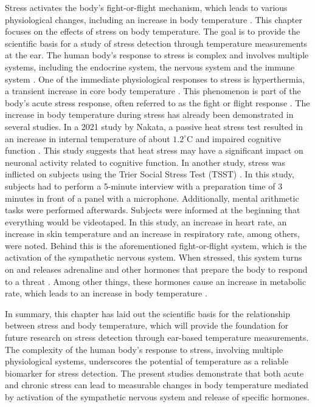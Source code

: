 Stress activates the body's fight-or-flight mechanism, which leads to various physiological changes, including an increase in body temperature \cite{marazzitiPsychologicalStressBody1992}. 
This chapter focuses on the effects of stress on body temperature. 
The goal is to provide the scientific basis for a study of stress detection through temperature measurements at the ear.
The human body's response to stress is complex and involves multiple systems, including the endocrine system, the nervous system and the immune system \cite{jamesUnderstandingRelationshipsPhysiological2023}. 
One of the immediate physiological responses to stress is hyperthermia, a transient increase in core body temperature \cite{vinkersEffectStressCore2013}. 
This phenomenon is part of the body's acute stress response, often referred to as the fight or flight response \cite{vinkersEffectStressCore2013}.
The increase in body temperature during stress has already been demonstrated in several studies.
In a 2021 study by Nakata, a passive heat stress test resulted in an increase in internal temperature of about $1.2 ^\circ\text{C}$ and impaired cognitive function \cite{nakataEffectsPassiveHeat2021}. 
This study suggests that heat stress may have a significant impact on neuronal activity related to cognitive function.
In another study, stress was inflicted on subjects using the Trier Social Stress Test (TSST) \cite{vinkersEffectStressCore2013}. 
In this study, subjects had to perform a 5-minute interview with a preparation time of 3 minutes in front of a panel with a microphone. 
Additionally, mental arithmetic tasks were performed afterwards. 
Subjects were informed at the beginning that everything would be videotaped.
In this study, an increase in heart rate, an increase in skin temperature and an increase in respiratory rate, among others, were noted. 
Behind this is the aforementioned fight-or-flight system, which is the activation of the sympathetic nervous system. 
When stressed, this system turns on and releases adrenaline and other hormones that prepare the body to respond to a threat \cite{jeremItCoolBe2023}.
Among other things, these hormones cause an increase in metabolic rate, which leads to an increase in body temperature \cite{greaneyNeurovascularResponsesWholebody2014}.

In summary, this chapter has laid out the scientific basis for the relationship between stress and body temperature, which will provide the foundation for future research on stress detection through ear-based temperature measurements. 
The complexity of the human body's response to stress, involving multiple physiological systems, underscores the potential of temperature as a reliable biomarker for stress detection. 
The present studies demonstrate that both acute and chronic stress can lead to measurable changes in body temperature mediated by activation of the sympathetic nervous system and release of specific hormones.

